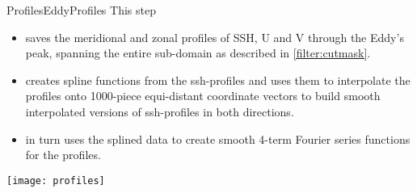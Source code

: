 \begin{filter}{Profiles}{EddyProfiles}
\label{filter:profiles}
This step
\begin{itemize}
\item
 saves the meridional and zonal profiles of SSH, U and V through  the Eddy's peak, spanning the entire sub-domain as described in \cref{filter:cutmask}.
\item
creates spline functions from the ssh-profiles and uses them to interpolate the profiles onto 1000-piece equi-distant coordinate vectors to build smooth interpolated versions of ssh-profiles in both directions.
\item
in turn uses the splined data to create smooth 4-term Fourier series functions for the profiles.
\end{itemize}
\end{filter}
\begin{marginfigure}
	\texttt{[image: profiles]}
	\caption{Zonal $x$- and $z$-normalized cyclone-profiles (early data $\sim$ '13/12).}
	\label{fig:profiles}
\end{marginfigure}
